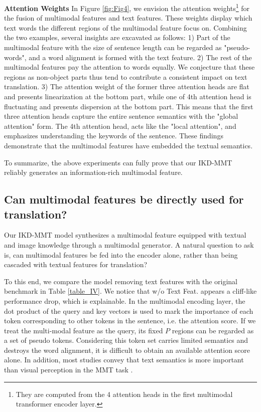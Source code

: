 \documentclass[11pt]{article}
\begin{document}
\textbf{Attention Weights}
In Figure \ref{fig:Fig4}, we envision the attention weights\footnote{They are computed from the 4 attention heads in the first multimodal transformer encoder layer.} for the fusion of multimodal features and text features.
These weights display which text words the different regions of the multimodal feature focus on.
Combining the two examples, several insights are excavated as follows:
1) Part of the multimodal feature with the size of sentence length can be regarded as "pseudo-words", and a word alignment is formed with the text feature.
2) The rest of the multimodal features pay the attention to words equally. We conjecture that these regions as non-object parts thus tend to contribute a consistent impact on text translation.
3) The attention weight of the former three attention heads are flat and presents linearization at the bottom part, while one of 4th attention head is fluctuating and presents dispersion at the bottom part.
This means that the first three attention heads capture the entire sentence semantics with the "global attention" form.
The 4th attention head, acts like the "local attention", and emphasizes understanding the keywords of the sentence.
These findings demonstrate that the multimodal features have embedded the textual semantics.

To summarize, the above experiments can fully prove that our IKD-MMT reliably generates an information-rich multimodal feature.

\subsection{Can multimodal features be directly used for translation?}
Our IKD-MMT model synthesizes a multimodal feature equipped with textual and image knowledge through a multimodal generator.
A natural question to ask is, can multimodal features be fed into the encoder alone, rather than being cascaded with textual features for translation?

To this end, we compare the model removing text features with the original benchmark in Table \ref{table_IV}.
We notice that w/o Text Feat. appears a cliff-like performance drop, which is explainable.
In the multimodal encoding layer, the dot product of the query and key vectors is used to mark the importance of each token corresponding to other tokens in the sentence, i.e. the attention score.
If we treat the multi-modal feature as the query, its fixed $P$ regions can be regarded as a set of pseudo tokens.
Considering this token set carries limited semantics and destroys the word alignment, it is difficult to obtain an available attention score alone.
In addition, most studies convey that text semantics is more important than visual perception in the MMT task \cite{gronroos-etal-2018-memad, lala-etal-2018-sheffield}.
\end{document}
